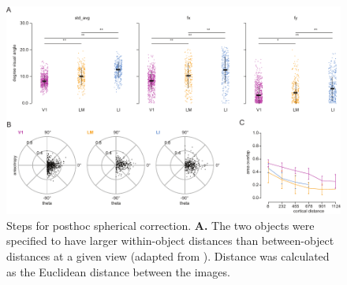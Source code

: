 \begin{figure}[t!]
\includegraphics[width=\textwidth]{figures/supplemental/fig_sX_spherical_correction_aggregate/fig_sX_spherical_correction_aggregate.pdf}
    \vspace{.1in}
    \caption[Spherical correction]{Steps for posthoc spherical correction.
    \textbf{A.} The two objects were specified to have larger within-object distances than between-object distances at a given view (adapted from \cite{Zoccolan2009}). Distance was calculated as the Euclidean distance between the images. 
    \label{supfig:spherical_correction_aggregate}}
\end{figure}


